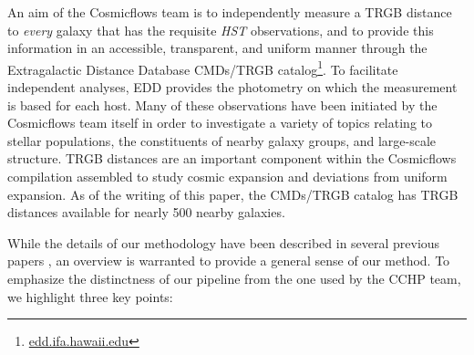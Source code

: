 \documentclass[twocolumn]{aastex62}
\begin{document}

An aim of the Cosmicflows team is to independently measure a TRGB distance to \textit{every} galaxy that has the requisite \textit{HST} observations, and to provide this information in an accessible, transparent, and uniform manner through the Extragalactic Distance Database CMDs/TRGB catalog\footnote{\url{edd.ifa.hawaii.edu}}.  To facilitate independent analyses, EDD provides the photometry on which the measurement is based for each host.  Many of these observations have been initiated by the Cosmicflows team itself in order to investigate a variety of topics relating to stellar populations, the constituents of nearby galaxy groups, and large-scale structure. TRGB distances are an important component within the Cosmicflows compilation assembled to study cosmic expansion and deviations from uniform expansion. As of the writing of this paper, the CMDs/TRGB catalog has TRGB distances available for nearly 500 nearby galaxies.

While the details of our methodology have been described in several previous papers \citep{2006AJ....132.2729M,2007ApJ...661..815R,2009AJ....138..332J,2014AJ....148....7W, 2021arXiv210402649A}, an overview is warranted to provide a general sense of our method.  To emphasize the distinctness of our pipeline from the one used by the CCHP team, we highlight three key points:
\end{document}
